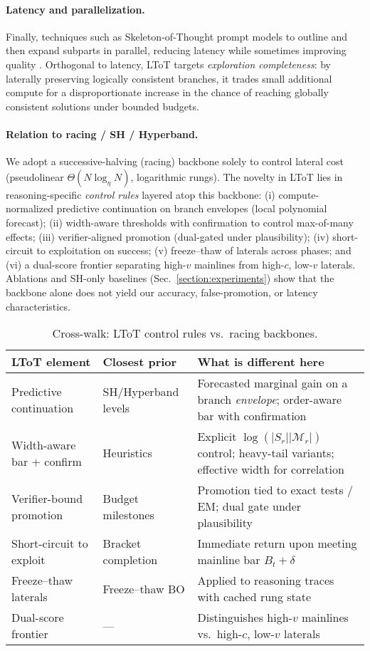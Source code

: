 \documentclass{article}
\begin{document}
\paragraph{Latency and parallelization.}
Finally, techniques such as Skeleton‑of‑Thought prompt models to outline and then expand subparts in parallel, reducing latency while sometimes improving quality \citep{ning2023sot}. Orthogonal to latency, LToT targets \emph{exploration completeness}: by laterally preserving logically consistent branches, it trades small additional compute for a disproportionate increase in the chance of reaching globally consistent solutions under bounded budgets.



\paragraph{Relation to racing / SH / Hyperband.}
We adopt a successive-halving (racing) backbone solely to control lateral cost (pseudolinear $\Theta(N\log_\eta N)$, logarithmic rungs).
The novelty in LToT lies in reasoning-specific \emph{control rules} layered atop this backbone:
(i) compute-normalized predictive continuation on branch envelopes (local polynomial forecast);
(ii) width-aware thresholds with confirmation to control max-of-many effects;
(iii) verifier-aligned promotion (dual-gated under plausibility);
(iv) short-circuit to exploitation on success;
(v) freeze--thaw of laterals across phases; and
(vi) a dual-score frontier separating high-$v$ mainlines from high-$c$, low-$v$ laterals.
Ablations and SH-only baselines (Sec.~\ref{section:experiments}) show that the backbone alone does not yield our accuracy, false-promotion, or latency characteristics.

\begin{table}[t]
\centering
\small
\begin{tabular}{@{}p{2.9cm}p{3.0cm}p{6.7cm}@{}}
\toprule
\textbf{LToT element} & \textbf{Closest prior} & \textbf{What is different here} \\
\midrule
Predictive continuation & SH/Hyperband levels & Forecasted marginal gain on a branch \emph{envelope}; order-aware bar with confirmation \\
Width-aware bar + confirm & Heuristics & Explicit $\log(|S_r||\mathcal{M}_r|)$ control; heavy-tail variants; effective width for correlation \\
Verifier-bound promotion & Budget milestones & Promotion tied to exact tests / EM; dual gate under plausibility \\
Short-circuit to exploit & Bracket completion & Immediate return upon meeting mainline bar $B_t+\delta$ \\
Freeze--thaw laterals & Freeze--thaw BO & Applied to reasoning traces with cached rung state \\
Dual-score frontier & --- & Distinguishes high-$v$ mainlines vs.\ high-$c$, low-$v$ laterals \\
\bottomrule
\end{tabular}
\caption{Cross-walk: LToT control rules vs.\ racing backbones.}
\end{table}
\end{document}

